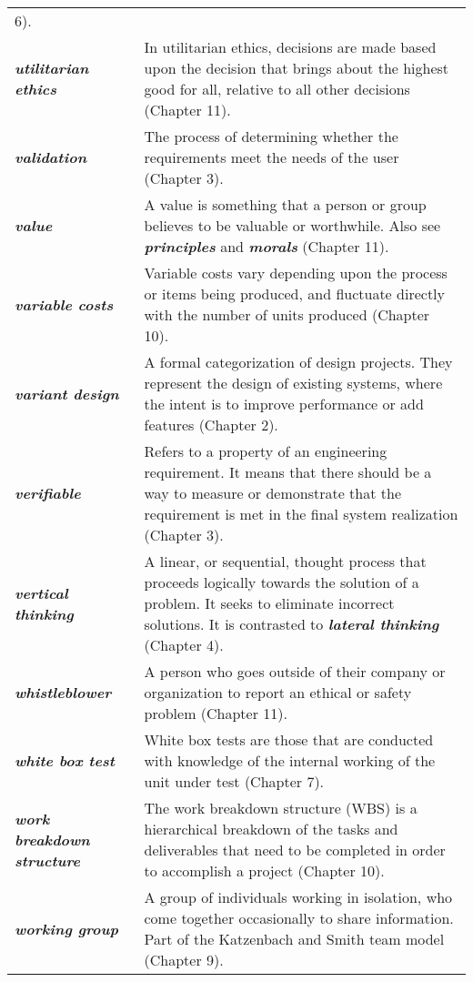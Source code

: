 \begin{longtable} { p{4cm} p{11cm}}
6). \\
\emph{\textbf{utilitarian ethics}} & In utilitarian ethics, decisions
are made based upon the decision that brings about the highest good for
all, relative to all other decisions (Chapter 11). \\
\emph{\textbf{validation}} & The process of determining whether the
requirements meet the needs of the user (Chapter 3). \\
\emph{\textbf{value}} & A value is something that a person or group
believes to be valuable or worthwhile. Also see
\emph{\textbf{principles}} and \emph{\textbf{morals}} (Chapter 11). \\
\emph{\textbf{variable costs}} & Variable costs vary depending upon the
process or items being produced, and fluctuate directly with the number
of units produced (Chapter 10). \\
\emph{\textbf{variant design}} & A formal categorization of design
projects. They represent the design of existing systems, where the
intent is to improve performance or add features (Chapter 2). \\
\emph{\textbf{verifiable}} & Refers to a property of an engineering
requirement. It means that there should be a way to measure or
demonstrate that the requirement is met in the final system realization
(Chapter 3). \\
\emph{\textbf{vertical thinking}} & A linear, or sequential, thought
process that proceeds logically towards the solution of a problem. It
seeks to eliminate incorrect solutions. It is contrasted to
\emph{\textbf{lateral thinking}} (Chapter 4). \\
\emph{\textbf{whistleblower}} & A person who goes outside of their
company or organization to report an ethical or safety problem (Chapter
11). \\
\emph{\textbf{white box test}} & White box tests are those that are
conducted with knowledge of the internal working of the unit under test
(Chapter 7). \\
\emph{\textbf{work breakdown structure}} & The work breakdown structure
(WBS) is a hierarchical breakdown of the tasks and deliverables that
need to be completed in order to accomplish a project (Chapter 10). \\
\emph{\textbf{working group}} & A group of individuals working in
isolation, who come together occasionally to share information. Part of
the Katzenbach and Smith team model (Chapter 9). \\
\end{longtable}
